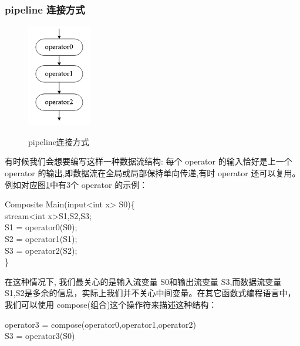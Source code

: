 \subsubsection{pipeline 连接方式}

\begin{figure}[htbp]
	\centering
	\includegraphics[width=0.25\textwidth]{Img/Chap_Application/Yu/pipeline.png}\\
	\caption{pipeline连接方式}\label{fig:pipeline}
\end{figure}

有时候我们会想要编写这样一种数据流结构: 每个 operator 的输入恰好是上一个 operator 的输出,即数据流在全局或局部保持单向传递,有时 operator 还可以复用。例如对应图\ref{fig:pipeline}中有3个 operator 的示例：

\begin{algorithm}\label{algo:costream}
Composite Main(input<int x> S0)\{\\
 \hspace*{1 pc} stream<int x>S1,S2,S3;\\
 \hspace*{1 pc} S1 = operator0(S0);\\
 \hspace*{1 pc} S2 = operator1(S1);\\
 \hspace*{1 pc} S3 = operator2(S2);\\
\}
\end{algorithm}

在这种情况下, 我们最关心的是输入流变量 S0和输出流变量 S3,而数据流变量S1,S2是多余的信息，实际上我们并不关心中间变量。在其它函数式编程语言中，我们可以使用 compose(组合)这个操作符来描述这种结构：

\begin{algorithm}\label{algo:costream}
operator3 = compose(operator0,operator1,operator2)\\
S3 = operator3(S0)
\end{algorithm}

